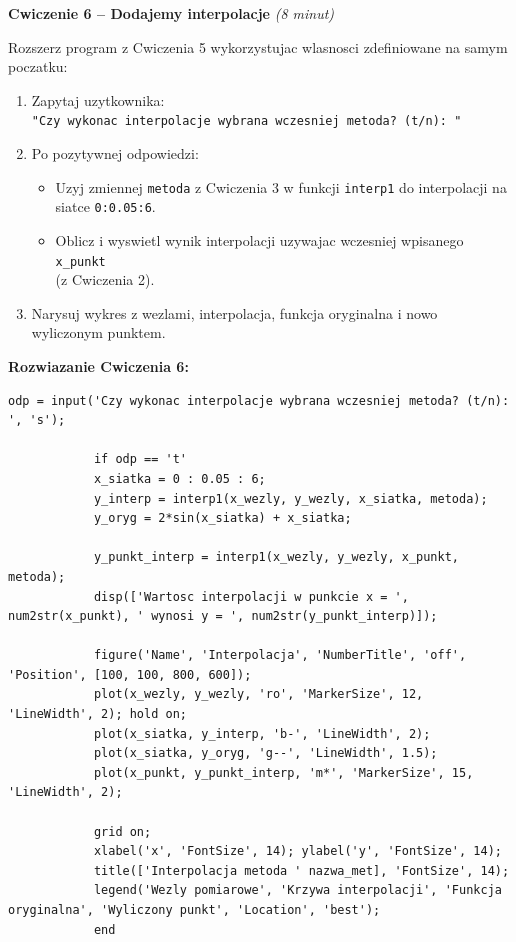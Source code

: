 \documentclass[12pt,a4paper]{article}
\begin{document}
	\begin{cwiczeniebox}
		\textbf{Cwiczenie 6 -- Dodajemy interpolacje} \quad \textit{(8 minut)}
		
		Rozszerz program z Cwiczenia 5 wykorzystujac wlasnosci zdefiniowane na samym poczatku:
		
		\begin{enumerate}[leftmargin=*,itemsep=2pt]
			\item Zapytaj uzytkownika:\\ \texttt{"Czy wykonac interpolacje wybrana wczesniej metoda? (t/n): "}
			\item Po pozytywnej odpowiedzi:
			\begin{itemize}
				\item Uzyj zmiennej \texttt{metoda} z Cwiczenia 3 w funkcji \texttt{interp1} do interpolacji na siatce \texttt{0:0.05:6}.
				\item Oblicz i wyswietl wynik interpolacji uzywajac wczesniej wpisanego \texttt{x\_punkt}\\(z Cwiczenia 2).
			\end{itemize}
			\item Narysuj wykres z wezlami, interpolacja, funkcja oryginalna i nowo wyliczonym punktem.
		\end{enumerate}
	\end{cwiczeniebox}
	
	\newpage
	\begin{rozwiazaniebox}
		\textbf{Rozwiazanie Cwiczenia 6:}
		\begin{lstlisting}[caption={Cwiczenie 6 - Interpolacja}]
			odp = input('Czy wykonac interpolacje wybrana wczesniej metoda? (t/n): ', 's');
			
			if odp == 't'
			x_siatka = 0 : 0.05 : 6;
			y_interp = interp1(x_wezly, y_wezly, x_siatka, metoda);
			y_oryg = 2*sin(x_siatka) + x_siatka;
			
			y_punkt_interp = interp1(x_wezly, y_wezly, x_punkt, metoda);
			disp(['Wartosc interpolacji w punkcie x = ', num2str(x_punkt), ' wynosi y = ', num2str(y_punkt_interp)]);
			
			figure('Name', 'Interpolacja', 'NumberTitle', 'off', 'Position', [100, 100, 800, 600]);
			plot(x_wezly, y_wezly, 'ro', 'MarkerSize', 12, 'LineWidth', 2); hold on;
			plot(x_siatka, y_interp, 'b-', 'LineWidth', 2);
			plot(x_siatka, y_oryg, 'g--', 'LineWidth', 1.5);
			plot(x_punkt, y_punkt_interp, 'm*', 'MarkerSize', 15, 'LineWidth', 2);
			
			grid on;
			xlabel('x', 'FontSize', 14); ylabel('y', 'FontSize', 14);
			title(['Interpolacja metoda ' nazwa_met], 'FontSize', 14);
			legend('Wezly pomiarowe', 'Krzywa interpolacji', 'Funkcja oryginalna', 'Wyliczony punkt', 'Location', 'best');
			end
		\end{lstlisting}
	\end{rozwiazaniebox}
	
\end{document}
